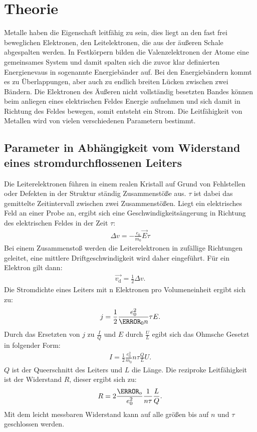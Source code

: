 \section{Theorie}
\label{sec:Theorie}
Metalle haben die Eigenschaft leitfähig zu sein, dies liegt an den
fast frei beweglichen Elektronen, den Leitelektronen, die aus der äußeren Schale abgespalten werden.
In Festkörpern bilden die Valenzelektronen der Atome eine gemeinsames System und damit spalten sich
die zuvor klar definierten Energienevaus in sogenannte Energiebänder auf.
Bei den Energiebändern kommt es zu Überlappungen, aber auch zu endlich breiten Lücken zwischen zwei Bändern.
Die Elektronen des Äußeren nicht vollständig besetzten Bandes können beim anliegen eines elektrischen Feldes Energie aufnehmen
und sich damit in Richtung des Feldes bewegen, somit entsteht ein Strom. Die Leitfähigkeit von Metallen wird von vielen verschiedenen Parametern bestimmt.

\subsection{Parameter in Abhängigkeit vom Widerstand eines stromdurchflossenen Leiters}
Die Leiterelektronen führen in einem realen Kristall auf Grund von Fehlstellen oder Defekten in der Struktur ständig
Zusammenstöße aus. $\tau$ ist dabei das gemittelte Zeitintervall zwischen zwei Zusammenstößen. Liegt ein elektrisches Feld an
einer Probe an, ergibt sich eine Geschwindigkeitsängerung in Richtung des elektrischen Feldes in der Zeit $\tau$:
\begin{align}
\Delta v=-\frac{e_0}{m_0}\vec{E}\tau
\end{align}
Bei einem Zusammenstoß werden die Leiterelektronen in zufällige Richtungen geleitet, eine mittlere Driftgeschwindigkeit wird daher eingeführt.
Für ein Elektron gilt dann:
\begin{align}
\vec{v_\mathrm{d}}=\frac{1}{2}\Delta v.
\end{align}
Die Stromdichte eines Leiters mit n Elektronen pro Volumeneinheit ergibt sich zu:
\begin{align}
j=\frac{1}{2}\frac{e_0^2}{\m_0 n} \tau E.
\end{align}
Durch das Ersetzten von $j$ zu $\frac{I}{Q}$ und $E$ durch $\frac{U}{L}$ egibt sich das Ohmsche Gesetzt in folgender Form:
\begin{align}
I=\frac{1}{2}\frac{e_0^2}{m_0}n\tau \frac{Q}{L}U.
\end{align}
$Q$ ist der Queerschnitt des Leiters und $L$ die Länge.
Die reziproke Leitfähigkeit ist der Widerstand $R$, dieser ergibt sich zu:
\begin{align}
R=2\frac{\m_o}{e_0^2}\frac{1}{n\tau}\frac{L}{Q}\label{eqn:wiederstand}.
\end{align}
Mit dem leicht messbaren Widerstand kann auf alle größen bis auf $n$ und $\tau$ geschlossen werden.


